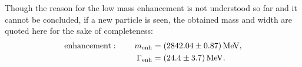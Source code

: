 Though the reason for the low mass enhancement is not understood so far and it cannot be concluded, if a new particle is seen, the obtained mass and width are quoted here for the sake of completeness:
\begin{align*}
    \text{enhancement}: \qquad  m_{\text{enh}} &= (2842.04 \pm 0.87) \mathrm{\,Me\kern -0.1em V}, \\
                                \Gamma_{\text{enh}}   &= (24.4 \pm 3.7) \mathrm{\,Me\kern -0.1em V}.
\end{align*}
